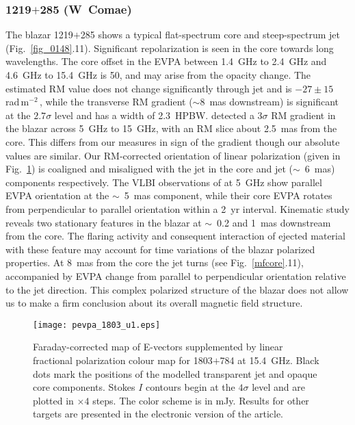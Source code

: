 \documentclass[a4paper,fleqn,usenatbib,useAMS]{mnras}
\newcommand{\rmu}{\,rad\,m$^{-2}$\,} %
\begin{document}
\subsubsection{1219$+$285 (W~Comae)}
The blazar 1219$+$285 shows a typical flat-spectrum core and steep-spectrum jet (Fig.~\ref{fig_0148}.11). 
Significant repolarization is seen in the core towards long wavelengths.
The core offset in the EVPA between 1.4~GHz to 2.4~GHz and 4.6~GHz to 15.4~GHz is 50\degr, and may arise from the opacity change.
The estimated RM value does not change significantly through jet and is $-27\pm15$~\rmu, while the transverse RM gradient ($\sim$8~mas downstream) is significant at the $2.7\sigma$ level and has a width of 2.3~HPBW.
\citet{2015MNRAS.450.2441G} detected a $3\sigma$ RM gradient in the blazar across 5~GHz to 15~GHz, with an RM slice about 2.5~mas from the core. 
This differs from our measures in sign of the gradient though our absolute values are similar. 
Our RM-corrected orientation of linear polarization (given in Fig.~\ref{fig_1803_u1}) is coaligned and misaligned with the jet in the core and jet ($\sim$~6~mas) components respectively. 
The VLBI observations of \citet{1994ApJ...435..140G} at 5~GHz show parallel EVPA orientation at the $\sim$~5~mas component, while their core EVPA rotates from perpendicular to parallel orientation within a 2~yr interval.
Kinematic study \citep{2016AJ....152...12L} reveals two stationary features in the blazar at $\sim$~0.2 and 1~mas downstream from the core.
The flaring activity and consequent interaction of ejected material with these feature may account for time variations of the blazar polarized properties.
At 8~mas from the core the jet turns (see Fig.~\ref{mfcore}.11), accompanied by EVPA change from parallel to perpendicular orientation relative to the jet direction.
This complex polarized structure of the blazar does not allow us to make a firm conclusion about its overall magnetic field structure.


\begin{figure}
 \centering
 \texttt{[image: pevpa\_1803\_u1.eps]}
 \caption{Faraday-corrected map of E-vectors supplemented by linear fractional polarization colour map for 1803$+$784 at 15.4~GHz.
 Black dots mark the positions of the modelled transparent jet and opaque core components.
 Stokes $I$ contours begin at the $4\sigma$ level and are plotted in $\times4$ steps. The color scheme is in mJy.
 Results for other targets are presented in the electronic version of the article.
  \label{fig_1803_u1}
 }
\end{figure}
\end{document}
